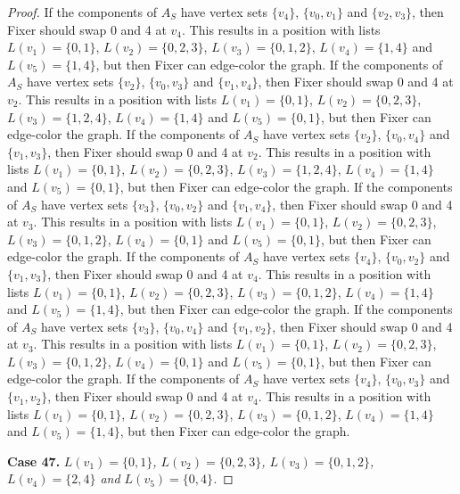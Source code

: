 \documentclass[12pt]{amsart}
\theoremstyle{plain}
\theoremstyle{definition}
\theoremstyle{remark}
\begin{document}
\begin{proof}
If the components of $A_S$ have vertex sets $\{v_4\}$, $\{v_0, v_1\}$ and $\{v_2, v_3\}$, then Fixer should swap 0 and 4 at $v_4$. This results in a position with lists $L(v_1) = \{0, 1\}$, $L(v_2) = \{0, 2, 3\}$, $L(v_3) = \{0, 1, 2\}$, $L(v_4) = \{1, 4\}$ and $L(v_5) = \{1, 4\}$, but then Fixer can edge-color the graph.
If the components of $A_S$ have vertex sets $\{v_2\}$, $\{v_0, v_3\}$ and $\{v_1, v_4\}$, then Fixer should swap 0 and 4 at $v_2$. This results in a position with lists $L(v_1) = \{0, 1\}$, $L(v_2) = \{0, 2, 3\}$, $L(v_3) = \{1, 2, 4\}$, $L(v_4) = \{1, 4\}$ and $L(v_5) = \{0, 1\}$, but then Fixer can edge-color the graph.
If the components of $A_S$ have vertex sets $\{v_2\}$, $\{v_0, v_4\}$ and $\{v_1, v_3\}$, then Fixer should swap 0 and 4 at $v_2$. This results in a position with lists $L(v_1) = \{0, 1\}$, $L(v_2) = \{0, 2, 3\}$, $L(v_3) = \{1, 2, 4\}$, $L(v_4) = \{1, 4\}$ and $L(v_5) = \{0, 1\}$, but then Fixer can edge-color the graph.
If the components of $A_S$ have vertex sets $\{v_3\}$, $\{v_0, v_2\}$ and $\{v_1, v_4\}$, then Fixer should swap 0 and 4 at $v_3$. This results in a position with lists $L(v_1) = \{0, 1\}$, $L(v_2) = \{0, 2, 3\}$, $L(v_3) = \{0, 1, 2\}$, $L(v_4) = \{0, 1\}$ and $L(v_5) = \{0, 1\}$, but then Fixer can edge-color the graph.
If the components of $A_S$ have vertex sets $\{v_4\}$, $\{v_0, v_2\}$ and $\{v_1, v_3\}$, then Fixer should swap 0 and 4 at $v_4$. This results in a position with lists $L(v_1) = \{0, 1\}$, $L(v_2) = \{0, 2, 3\}$, $L(v_3) = \{0, 1, 2\}$, $L(v_4) = \{1, 4\}$ and $L(v_5) = \{1, 4\}$, but then Fixer can edge-color the graph.
If the components of $A_S$ have vertex sets $\{v_3\}$, $\{v_0, v_4\}$ and $\{v_1, v_2\}$, then Fixer should swap 0 and 4 at $v_3$. This results in a position with lists $L(v_1) = \{0, 1\}$, $L(v_2) = \{0, 2, 3\}$, $L(v_3) = \{0, 1, 2\}$, $L(v_4) = \{0, 1\}$ and $L(v_5) = \{0, 1\}$, but then Fixer can edge-color the graph.
If the components of $A_S$ have vertex sets $\{v_4\}$, $\{v_0, v_3\}$ and $\{v_1, v_2\}$, then Fixer should swap 0 and 4 at $v_4$. This results in a position with lists $L(v_1) = \{0, 1\}$, $L(v_2) = \{0, 2, 3\}$, $L(v_3) = \{0, 1, 2\}$, $L(v_4) = \{1, 4\}$ and $L(v_5) = \{1, 4\}$, but then Fixer can edge-color the graph.

\noindent\textbf{Case 47.  }\textit{$L(v_1) = \{0, 1\}$, $L(v_2) = \{0, 2, 3\}$, $L(v_3) = \{0, 1, 2\}$, $L(v_4) = \{2, 4\}$ and $L(v_5) = \{0, 4\}$.}


\end{proof}
\end{document}

